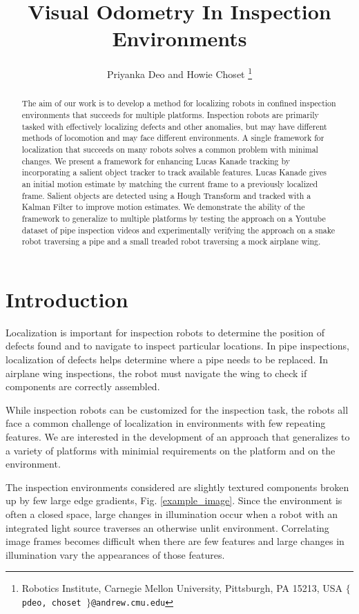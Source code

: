 \documentclass[letterpaper, 10 pt, conference]{ieeeconf}
\title{\LARGE \bf Visual Odometry In Inspection Environments}
\author{Priyanka Deo and Howie Choset%
\thanks{Robotics Institute,
Carnegie Mellon University,
Pittsburgh, PA 15213, USA
{\tt\small $\lbrace$ pdeo, choset $\rbrace$@andrew.cmu.edu}}%
}
\begin{document}
\maketitle
\thispagestyle{empty}
\pagestyle{empty}


\begin{abstract}

The aim of our work is to develop a method for localizing robots in confined inspection environments that succeeds for multiple platforms. Inspection robots are primarily tasked with effectively localizing defects and other anomalies, but may have different methods of locomotion and may face different environments. A single framework for localization that succeeds on many robots solves a common problem with minimal changes. We present a framework for enhancing Lucas Kanade tracking by incorporating a salient object tracker to track available features. Lucas Kanade gives an initial motion estimate by matching the current frame to a previously localized frame. Salient objects are detected using a Hough Transform and tracked with a Kalman Filter to improve motion estimates. We demonstrate the ability of the framework to generalize to multiple platforms by testing the approach on a Youtube dataset of pipe inspection videos and experimentally verifying the approach on a snake robot traversing a pipe and a small treaded robot traversing a mock airplane wing.

\end{abstract}


\section{Introduction}

Localization is important for inspection robots to determine the position of defects found and to navigate to inspect particular locations. In pipe inspections, localization of defects helps determine where a pipe needs to be replaced. In airplane wing inspections, the robot must navigate the wing to check if components are correctly assembled.

While inspection robots can be customized for the inspection task, the robots all face a common challenge of localization in environments with few repeating features. We are interested in the development of an approach that generalizes to a variety of platforms with minimial requirements on the platform and on the environment.

The inspection environments considered are slightly textured components broken up by few large edge gradients, Fig. \ref{example_image}. Since the environment is often a closed space, large changes in illumination occur when a robot with an integrated light source traverses an otherwise unlit environment. Correlating image frames becomes difficult when there are few features and large changes in illumination vary the appearances of those features.
\end{document}
